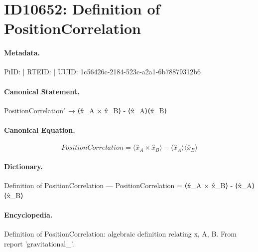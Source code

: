\section*{ID10652: Definition of PositionCorrelation}
\paragraph{Metadata.}
PiID:  | RTEID:  | UUID: 1c56426c-2184-523c-a2a1-6b78879312b6

\paragraph{Canonical Statement.}
PositionCorrelation" → ⟨x̂\_A × x̂\_B⟩ - ⟨x̂\_A⟩⟨x̂\_B⟩

\paragraph{Canonical Equation.}
\[
PositionCorrelation = ⟨x̂_A × x̂_B⟩ - ⟨x̂_A⟩⟨x̂_B⟩
\]

\paragraph{Dictionary.}
Definition of PositionCorrelation — PositionCorrelation = ⟨x̂\_A × x̂\_B⟩ - ⟨x̂\_A⟩⟨x̂\_B⟩

\paragraph{Encyclopedia.}
Definition of PositionCorrelation: algebraic definition relating x, A, B. From report 'gravitational\_'.
